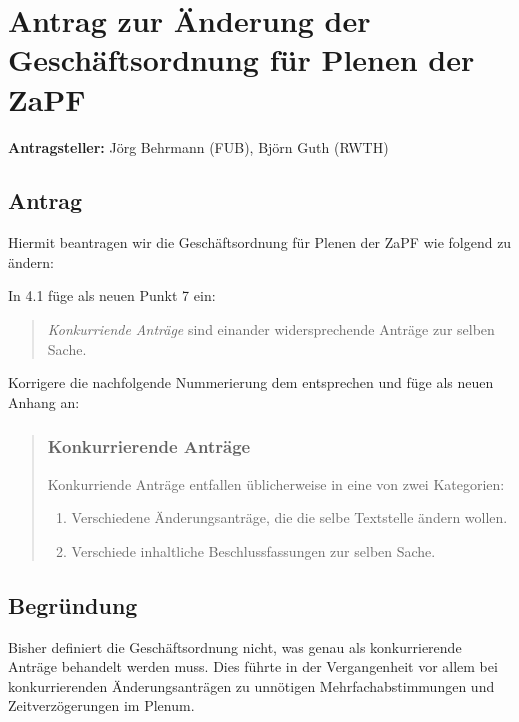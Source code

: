 \documentclass[draft,10pt,oneside]{scrartcl}
\begin{document}
\section*{Antrag zur Änderung der Geschäftsordnung für Plenen der ZaPF}

\textbf{Antragsteller:} Jörg Behrmann (FUB), Björn Guth (RWTH)

\subsection*{Antrag}

Hiermit beantragen wir die Geschäftsordnung für Plenen der ZaPF wie folgend zu
ändern:

In 4.1 füge als neuen Punkt 7 ein:
\begin{quote}
	\textit{Konkurriende Anträge} sind einander widersprechende Anträge zur
	selben Sache.
\end{quote}
Korrigere die nachfolgende Nummerierung dem entsprechen und füge als neuen
Anhang an:
\begin{quote}
	\subsubsection*{Konkurrierende Anträge}
	Konkurriende Anträge entfallen üblicherweise in eine von zwei Kategorien:
	\begin{enumerate}
		\item Verschiedene Änderungsanträge, die die selbe Textstelle ändern
			wollen.
		\item Verschiede inhaltliche Beschlussfassungen zur selben Sache.
	\end{enumerate}
\end{quote}

\subsection*{Begründung}
Bisher definiert die Geschäftsordnung nicht, was genau als konkurrierende
Anträge behandelt werden muss. Dies führte in der Vergangenheit vor allem bei
konkurrierenden Änderungsanträgen zu unnötigen Mehrfachabstimmungen und
Zeitverzögerungen im Plenum.
\end{document}
